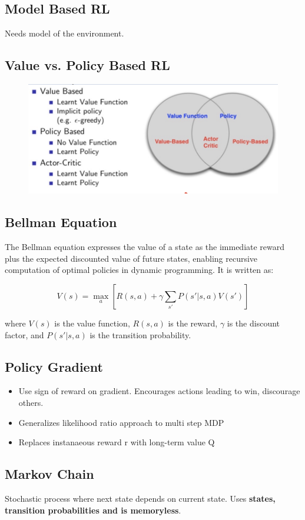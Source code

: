 \documentclass[12pt,a4paper]{article}
\begin{document}
\subsection{Model Based RL}
Needs model of the environment.
\subsection{Value vs. Policy Based RL}
\begin{figure}[h!]
    \centering
    \includegraphics[width=0.5\linewidth]{valuepolicy.png}
    \label{fig:enter-label}
\end{figure}
\subsection{Bellman Equation}
The Bellman equation expresses the value of a state as the immediate reward plus the expected discounted value of future states, enabling recursive computation of optimal policies in dynamic programming. It is written as:

\[
V(s) = \max_a \left[ R(s, a) + \gamma \sum_{s'} P(s' | s, a) V(s') \right]
\]

where \( V(s) \) is the value function, \( R(s, a) \) is the reward, \( \gamma \) is the discount factor, and \( P(s' | s, a) \) is the transition probability.

\subsection{Policy Gradient}
\begin{itemize}
    \item Use sign of reward on gradient. Encourages actions leading to win, discourage others.
    \item Generalizes likelihood ratio approach to multi step MDP
    \item Replaces instanaeous reward r with long-term value Q
\end{itemize}
\subsection{Markov Chain}
Stochastic process where next state depends on current state. Uses \textbf{states, transition probabilities and is memoryless}.
\end{document}
